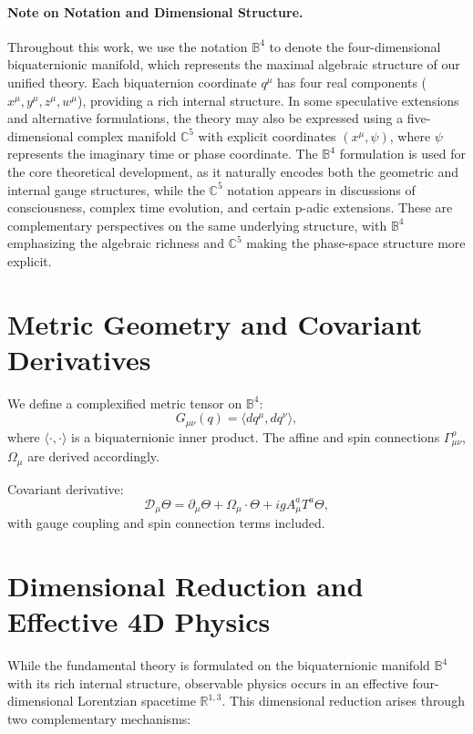 \documentclass[12pt]{article}
\begin{document}
\paragraph{Note on Notation and Dimensional Structure.}
Throughout this work, we use the notation \( \mathbb{B}^4 \) to denote the four-dimensional biquaternionic manifold, which represents the maximal algebraic structure of our unified theory. Each biquaternion coordinate \( q^\mu \) has four real components (\( x^\mu, y^\mu, z^\mu, w^\mu \)), providing a rich internal structure. In some speculative extensions and alternative formulations, the theory may also be expressed using a five-dimensional complex manifold \( \mathbb{C}^5 \) with explicit coordinates \( (x^\mu, \psi) \), where \( \psi \) represents the imaginary time or phase coordinate. The \( \mathbb{B}^4 \) formulation is used for the core theoretical development, as it naturally encodes both the geometric and internal gauge structures, while the \( \mathbb{C}^5 \) notation appears in discussions of consciousness, complex time evolution, and certain p-adic extensions. These are complementary perspectives on the same underlying structure, with \( \mathbb{B}^4 \) emphasizing the algebraic richness and \( \mathbb{C}^5 \) making the phase-space structure more explicit.

\section{Metric Geometry and Covariant Derivatives}

We define a complexified metric tensor on \( \mathbb{B}^4 \):
\[
G_{\mu\nu}(q) = \langle dq^\mu, dq^\nu \rangle,
\]
where \( \langle \cdot, \cdot \rangle \) is a biquaternionic inner product. The affine and spin connections \( \Gamma^\rho_{\mu\nu} \), \( \Omega_\mu \) are derived accordingly.

Covariant derivative:
\[
\mathcal{D}_\mu \Theta = \partial_\mu \Theta + \Omega_\mu \cdot \Theta + i g A_\mu^a T^a \Theta,
\]
with gauge coupling and spin connection terms included.

\section{Dimensional Reduction and Effective 4D Physics}

While the fundamental theory is formulated on the biquaternionic manifold \( \mathbb{B}^4 \) with its rich internal structure, observable physics occurs in an effective four-dimensional Lorentzian spacetime \( \mathbb{R}^{1,3} \). This dimensional reduction arises through two complementary mechanisms:
\end{document}
